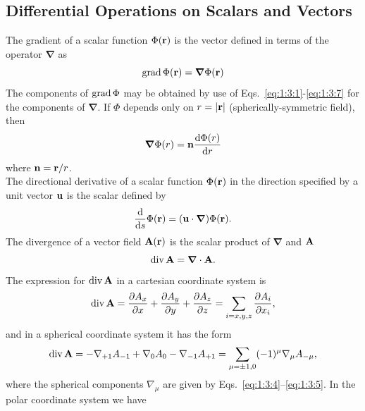 \subsection{Differential Operations on Scalars and Vectors}\label{sec:1.3.3}
The gradient of a scalar function \(\Phi(\mathbf{r})\) is the vector defined in terms of the operator $\boldsymbol{\nabla}$ as
\begin{equation}
\operatorname{grad}  \Phi(\mathbf{r})=\boldsymbol{\nabla} \Phi(\mathbf{r}) \label{eq:1:3:17}
\end{equation}
The components of \(\operatorname{grad}\Phi\) may be obtained by use of Eqs.~\eqref{eq:1:3:1}-\eqref{eq:1:3:7} for the components of \(\boldsymbol{\nabla}\). If \(\Phi\) depends only on \(r=|\mathbf{r}|\) (spherically-symmetric field), then
\begin{equation}
\boldsymbol{\nabla} \Phi(r)=\mathbf{n} \frac{\mathrm{d} \Phi(r)}{\mathrm{d} r} \label{eq:1:3:18}
\end{equation}
where \(\mathbf{n}=\mathbf{r} / r\).\\
The directional derivative of a scalar function \(\Phi(\mathbf{r})\) in the direction specified by a unit vector \(\mathbf{u}\) is the scalar defined by
\begin{equation}
\frac{\mathrm{d}}{\mathrm{d} s} \Phi(\mathbf{r})=(\mathbf{u} \cdot \boldsymbol{\nabla}) \Phi(\mathbf{r}) .\label{eq:1:3:19}
\end{equation}
The divergence of a vector field \(\mathbf{A}(\mathbf{r})\) is the scalar product of $\boldsymbol{\nabla}$ and \(\mathbf{A}\)
\begin{equation}
\operatorname{div}  \mathbf{A}=\boldsymbol{\nabla} \cdot \mathbf{A} . \label{eq:1:3:20}
\end{equation}
The expression for \(\operatorname{div}  \mathbf{A}\) in a cartesian coordinate system is
\begin{equation}
\operatorname{div}  \mathbf{A}=\frac{\partial A_{x}}{\partial x}+\frac{\partial A_{y}}{\partial y}+\frac{\partial A_{z}}{\partial z}=\sum_{i=x, y, z} \frac{\partial A_{i}}{\partial x_{i}} , \label{eq:1:3:21}
\end{equation}
and in a spherical coordinate system it has the form
\begin{equation}
\operatorname{div}  \mathbf{A}=-\nabla_{+1} A_{-1}+\nabla_{0} A_{0}-\nabla_{-1} A_{+1}=\sum_{\mu= \pm 1,0}(-1)^{\mu} \nabla_{\mu} A_{-\mu} ,\label{eq:1:3:22}
\end{equation}
where the spherical components \(\nabla_{\mu}\) are given by Eqs.~\eqref{eq:1:3:4}--\eqref{eq:1:3:5}. In the polar coordinate system we have
